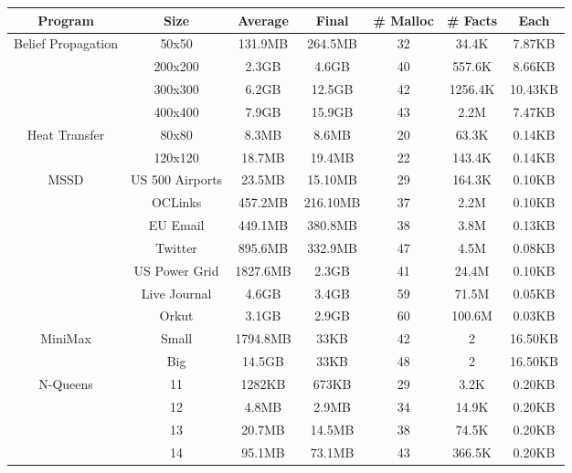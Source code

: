 \begin{tabular}{c | c || c | c | c || c c} \hline
	\textbf{Program} & \textbf{Size} & \textbf{Average} & \textbf{Final} & \textbf{\# Malloc} & \textbf{\# Facts} & \textbf{Each} \\ \hline \hline
	\multirow{4}{*}{Belief Propagation}  & 50x50 & 131.9MB & 264.5MB & 32 & 34.4K & 7.87KB \\
		 & 200x200 & 2.3GB & 4.6GB & 40 & 557.6K & 8.66KB \\
		 & 300x300 & 6.2GB & 12.5GB & 42 & 1256.4K & 10.43KB \\
		 & 400x400 & 7.9GB & 15.9GB & 43 & 2.2M & 7.47KB \\
	\hline
	\multirow{2}{*}{Heat Transfer}  & 80x80 & 8.3MB & 8.6MB & 20 & 63.3K & 0.14KB \\
		 & 120x120 & 18.7MB & 19.4MB & 22 & 143.4K & 0.14KB \\
	\hline
	\multirow{7}{*}{MSSD}  & US 500 Airports & 23.5MB & 15.10MB & 29 & 164.3K & 0.10KB \\
		 & OCLinks & 457.2MB & 216.10MB & 37 & 2.2M & 0.10KB \\
		 & EU Email & 449.1MB & 380.8MB & 38 & 3.8M & 0.13KB \\
		 & Twitter & 895.6MB & 332.9MB & 47 & 4.5M & 0.08KB \\
		 & US Power Grid & 1827.6MB & 2.3GB & 41 & 24.4M & 0.10KB \\
		 & Live Journal & 4.6GB & 3.4GB & 59 & 71.5M & 0.05KB \\
		 & Orkut & 3.1GB & 2.9GB & 60 & 100.6M & 0.03KB \\
	\hline
	\multirow{2}{*}{MiniMax}  & Small & 1794.8MB & 33KB & 42 & 2 & 16.50KB \\
		 & Big & 14.5GB & 33KB & 48 & 2 & 16.50KB \\
	\hline
	\multirow{4}{*}{N-Queens}  & 11 & 1282KB & 673KB & 29 & 3.2K & 0.20KB \\
		 & 12 & 4.8MB & 2.9MB & 34 & 14.9K & 0.20KB \\
		 & 13 & 20.7MB & 14.5MB & 38 & 74.5K & 0.20KB \\
		 & 14 & 95.1MB & 73.1MB & 43 & 366.5K & 0.20KB \\
	\hline
\end{tabular}
